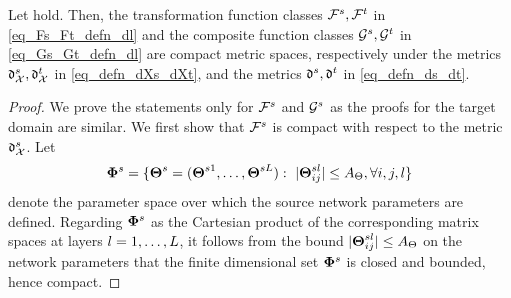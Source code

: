 \documentclass[review,supplement,onefignum,onetabnum]{siamonline250211}
\begin{document}
\begin{lemma}
    \label{lem_Fs_Ft_HFs_HFt_comp}
    Let  hold. Then, the transformation function classes $\mathcal{F}^s, \mathcal{F}^t$ in \eqref{eq_Fs_Ft_defn_dl} and the composite function classes $\mathcal{G}^s, \mathcal{G}^t$ in \eqref{eq_Gs_Gt_defn_dl} are compact metric spaces, respectively under the metrics $\mathfrak{d}^s_{\mathcal{X}} , \mathfrak{d}^t_{\mathcal{X}} $ in \eqref{eq_defn_dXs_dXt}, and the metrics $\mathfrak{d}^s, \mathfrak{d}^t$ in \eqref{eq_defn_ds_dt}.
\end{lemma}

\begin{proof}
\label{pf_lem_Fs_Ft_HFs_HFt_comp}
We prove the statements only for $\mathcal{F}^s$ and $\mathcal{G}^s$ as the proofs for the target domain are similar. We first show that $\mathcal{F}^s$ is compact with respect to the metric $\mathfrak{d}^s_{\mathcal{X}}  $. Let
%
\begin{equation*}
\begin{split}
\mathbf{\Phi}^{s}&=\{ \boldsymbol{\Theta}^{s}=(\boldsymbol{\Theta}^{s1}, \dots, \boldsymbol{\Theta}^{s L}):  \ |\boldsymbol{\Theta}^{sl}_{ij}|  \leq {A_\Theta}, \forall i, j, l \} \\
\end{split}
\end{equation*}
%
denote the parameter space over which the source network parameters are defined. Regarding $\mathbf{\Phi}^{s} $ as the Cartesian product of the corresponding matrix spaces at layers $l=1, \dots, L$, it follows from the bound $ |\boldsymbol{\Theta}^{sl}_{ij}|  \leq {A_\Theta}$ on the network parameters that the finite dimensional set $\mathbf{\Phi}^{s} $ is closed and bounded, hence compact.
    

\end{proof}
\end{document}
